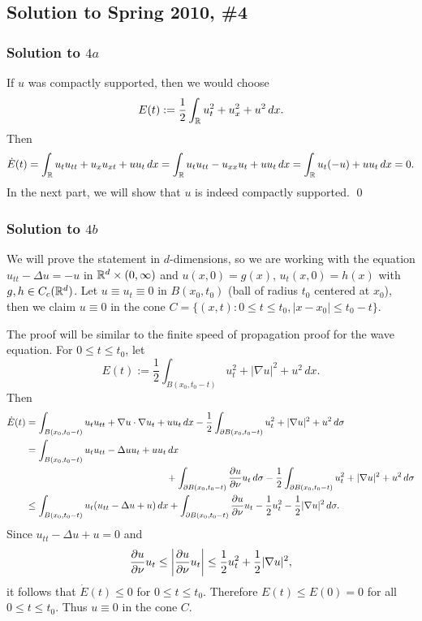 \subsection*{Solution to Spring 2010, \#4}\label{s104}
\subsubsection*{Solution to $4a$}
If $u$ was compactly supported, then we would choose
$$E(t) := \frac{1}{2}\int_{\mathbb{R}}u_{t}^{2} + u_{x}^{2} + u^{2}\, dx.$$
Then
$$\dot{E}(t) = \int_{\mathbb{R}}u_{t}u_{tt} + u_{x}u_{xt} + uu_{t}\, dx = \int_{\mathbb{R}}u_{t}u_{tt} - u_{xx}u_{t} + uu_{t}\, dx = \int_{\mathbb{R}}u_{t}(-u) + uu_{t}\, dx = 0.$$
In the next part, we will show that $u$ is indeed compactly supported.
\hfill\qed

\subsubsection*{Solution to $4b$}
We will prove the statement in $d$-dimensions, so we are working with the equation $u_{tt} - \Delta u = -u$ in $\mathbb{R}^{d} \times (0, \infty)$
and $u(x, 0) = g(x)$, $u_{t}(x, 0) = h(x)$ with $g, h \in C_{c}(\mathbb{R}^{d})$. Let $u \equiv u_{t} \equiv 0$ in $B(x_{0}, t_{0})$ (ball of radius $t_{0}$ centered at $x_{0}$), then we claim
$u \equiv 0$ in the cone $C = \{(x, t): 0 \leq t \leq t_{0}, |x - x_{0}| \leq t_{0} - t\}$.

The proof will be similar to the finite speed of propagation proof for the wave equation.
For $0 \leq t \leq t_{0}$, let
$$E(t) := \frac{1}{2}\int_{B(x_{0}, t_{0} - t)}u_{t}^{2} + |\nabla u|^{2} + u^{2}\, dx.$$
Then
\begin{align*}
\dot{E}(t) &= \int_{B(x_{0}, t_{0} - t)}u_{t}u_{tt} + \nabla u \cdot \nabla u_{t} + uu_{t}\, dx - \frac{1}{2}\int_{\partial B(x_{0}, t_{0} - t)}u_{t}^{2} + |\nabla u|^{2} + u^{2}\, d\sigma\\
&= \int_{B(x_{0}, t_{0} - t)}u_{t}u_{tt} - \Delta u u_{t} + u u_{t}\, dx\\
&\hspace{2in}+ \int_{\partial B(x_{0}, t_{0} - t)}\frac{\partial u}{\partial \nu}u_{t}\, d\sigma - \frac{1}{2}\int_{\partial B(x_{0}, t_{0} - t)}u_{t}^{2} + |\nabla u|^{2} + u^{2}\, d\sigma\\
&\leq \int_{B(x_{0}, t_{0} - t)}u_{t}(u_{tt} - \Delta u + u)\, dx + \int_{\partial B(x_{0}, t_{0} - t)}\frac{\partial u}{\partial \nu}u_{t} - \frac{1}{2}u_{t}^{2} - \frac{1}{2}|\nabla u|^{2}\, d\sigma.
\end{align*}
Since $u_{tt} - \Delta u + u = 0$ and
\begin{align*}
\frac{\partial u}{\partial \nu}u_{t} \leq \bigg| \frac{\partial u}{\partial \nu}u_{t} \bigg| \leq \frac{1}{2}u_{t}^{2} + \frac{1}{2}|\nabla u|^{2},
\end{align*}
it follows that $\dot{E}(t) \leq 0$ for $0 \leq t \leq t_{0}$. Therefore $E(t) \leq E(0) = 0$ for all $0 \leq t \leq t_{0}$. Thus
$u \equiv 0$ in the cone $C$.

